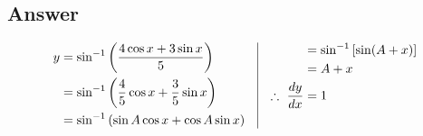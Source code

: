 \documentclass[17pt]{extarticle}
\begin{document}
\begin{fleqn}
\subsection*{Answer}
\begin{equation} \nonumber
\begin{alignedat}{4}
y &=  \sin^{-1}\left(\frac{4\cos x + 3\sin x}{5}\right)\\
  &=  \sin^{-1}\left(\frac{4}{5}\cos x + \frac{3}{5}\sin x\right)\\
 &=  \sin^{-1}\left(\sin A\cos x + \cos A\sin x\right)\\
\end{alignedat}
\quad
\vrule
\quad 
\begin{alignedat}{4}
&=  \sin^{-1}\left[\sin (A + x)\right] \\
&=  A + x \\
\therefore \  \frac{dy}{dx} &= 1
& \\
& \\
\end{alignedat}
\end{equation}


\end{fleqn}
\end{document}
